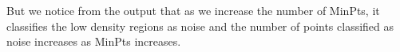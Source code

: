 \documentclass[paper=a4, fontsize=11pt]{scrartcl}
\numberwithin{equation}{section}		%
\numberwithin{figure}{section}			%
\numberwithin{table}{section}				%
\begin{document}
But we notice from the output that as we increase the number of MinPts, it classifies the low density regions as noise and the number of points classified as noise increases as MinPts increases. 

\graphicspath{ {../Dataset/1_Clustering/Visualisations/} }
\begin{figure}[H]
  \centering
  \hfill
\end{figure}

\graphicspath{ {../Dataset/1_Clustering/Visualisations/} }
\begin{figure}[H]
  \centering
  \hfill
\end{figure}
\end{document}
